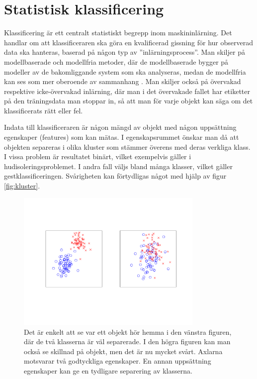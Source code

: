 \documentclass[../rapport_MVEX01-11-05]{subfiles}
\begin{document}
\section{Statistisk klassificering}\label{sec:klassificering}

Klassificering är ett centralt statistiskt begrepp inom maskininlärning.
Det handlar om att klassificeraren ska göra en kvalificerad gissning för hur
observerad data ska hanteras, baserad på någon typ av ''inlärningsprocess''.
Man skiljer på modellbaserade och modellfria metoder, där de modellbaserade
bygger på modeller av de bakomliggande system som ska analyseras, medan de
modellfria kan ses som mer oberoende av sammanhang \cite{Hastie09}.
Man skiljer också på övervakad respektive icke-övervakad inlärning,
där man i det övervakade fallet har etiketter på den träningsdata man stoppar
in, så att man för varje objekt kan säga om det klassificerats rätt eller
fel.

Indata till klassificeraren är någon mängd av objekt med någon uppsättning
egenskaper (features) som kan mätas.
I egenskapsrummet önskar man då att objekten separeras i olika kluster
som stämmer överens med deras verkliga klass.
I vissa problem är resultatet binärt,
vilket exempelvis gäller i hudisoleringsproblemet.
I andra fall väljs bland många klasser, vilket gäller gestklassificeringen.
Svårigheten kan förtydligas något med hjälp av figur \vref{fig:kluster}.
\begin{figure}[!htpb]
    \begin{center}
\includegraphics[width=0.8\textwidth,clip=true,trim=2cm 3cm 1.5cm 3cm]{bilder/kluster.pdf}
    \end{center}
    \caption{Det är enkelt att se var ett objekt hör hemma i den vänstra figuren,
    där de två klasserna är väl separerade. I den högra figuren kan man också se
    skillnad på objekt, men det är nu mycket svårt. Axlarna motsvarar
    två godtyckliga egenskaper. En annan uppsättning egenskaper kan ge en
    tydligare separering av klasserna.}
    \label{fig:kluster}
\end{figure}
\end{document}
